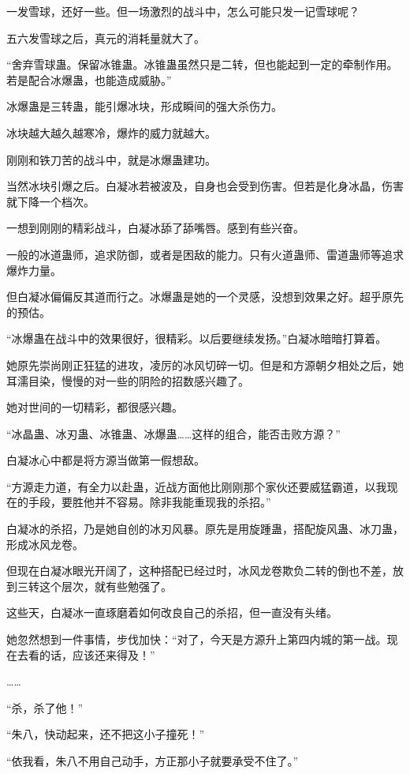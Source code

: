 \begin{this_body}
一发雪球，还好一些。但一场激烈的战斗中，怎么可能只发一记雪球呢？

五六发雪球之后，真元的消耗量就大了。

“舍弃雪球蛊。保留冰锥蛊。冰锥蛊虽然只是二转，但也能起到一定的牵制作用。若是配合冰爆蛊，也能造成威胁。”

冰爆蛊是三转蛊，能引爆冰块，形成瞬间的强大杀伤力。

冰块越大越久越寒冷，爆炸的威力就越大。

刚刚和铁刀苦的战斗中，就是冰爆蛊建功。

当然冰块引爆之后。白凝冰若被波及，自身也会受到伤害。但若是化身冰晶，伤害就下降一个档次。

一想到刚刚的精彩战斗，白凝冰舔了舔嘴唇。感到有些兴奋。

一般的冰道蛊师，追求防御，或者是困敌的能力。只有火道蛊师、雷道蛊师等追求爆炸力量。

但白凝冰偏偏反其道而行之。冰爆蛊是她的一个灵感，没想到效果之好。超乎原先的预估。

“冰爆蛊在战斗中的效果很好，很精彩。以后要继续发扬。”白凝冰暗暗打算着。

她原先崇尚刚正狂猛的进攻，凌厉的冰风切碎一切。但是和方源朝夕相处之后，她耳濡目染，慢慢的对一些的阴险的招数感兴趣了。

她对世间的一切精彩，都很感兴趣。

“冰晶蛊、冰刃蛊、冰锥蛊、冰爆蛊……这样的组合，能否击败方源？”

白凝冰心中都是将方源当做第一假想敌。

“方源走力道，有全力以赴蛊，近战方面他比刚刚那个家伙还要威猛霸道，以我现在的手段，要胜他并不容易。除非我能重现我的杀招。”

白凝冰的杀招，乃是她自创的冰刃风暴。原先是用旋踵蛊，搭配旋风蛊、冰刀蛊，形成冰风龙卷。

但现在白凝冰眼光开阔了，这种搭配已经过时，冰风龙卷欺负二转的倒也不差，放到三转这个层次，就有些勉强了。

这些天，白凝冰一直琢磨着如何改良自己的杀招，但一直没有头绪。

她忽然想到一件事情，步伐加快：“对了，今天是方源升上第四内城的第一战。现在去看的话，应该还来得及！”

……

“杀，杀了他！”

“朱八，快动起来，还不把这小子撞死！”

“依我看，朱八不用自己动手，方正那小子就要承受不住了。”


\end{this_body}
